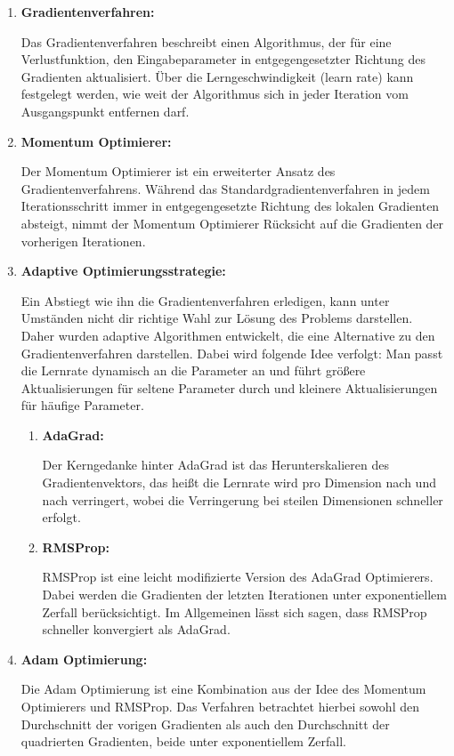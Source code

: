 	\begin{enumerate}
		\item \textbf{Gradientenverfahren:}
		
			Das Gradientenverfahren beschreibt einen Algorithmus, der für eine Verlustfunktion, den Eingabeparameter in entgegengesetzter Richtung des Gradienten aktualisiert. Über die  Lerngeschwindigkeit (learn rate) kann festgelegt werden, wie weit der Algorithmus sich in jeder Iteration vom Ausgangspunkt entfernen darf. \cite{lucas_plagwitz}
		
		\item \textbf{Momentum Optimierer:}
		
			Der Momentum Optimierer ist ein erweiterter Ansatz des Gradientenverfahrens. Während das \glqq Standardgradientenverfahren\grqq{} in jedem Iterationsschritt immer in entgegengesetzte Richtung des lokalen Gradienten absteigt, nimmt der Momentum Optimierer Rücksicht auf die Gradienten der vorherigen Iterationen. \cite{lucas_plagwitz}
			
		\item \textbf{Adaptive Optimierungsstrategie:}
		
			Ein Abstiegt wie ihn die Gradientenverfahren erledigen, kann unter Umständen nicht dir richtige Wahl zur Lösung des Problems darstellen. Daher wurden adaptive Algorithmen entwickelt, die eine Alternative zu den Gradientenverfahren darstellen. Dabei wird folgende Idee verfolgt: Man passt die Lernrate dynamisch an die Parameter an und führt größere Aktualisierungen für seltene Parameter durch und kleinere Aktualisierungen für häufige Parameter. \cite{lucas_plagwitz}
			\newpage
			\begin{enumerate}
				\item \textbf{AdaGrad:}
				
					Der Kerngedanke hinter AdaGrad ist das Herunterskalieren des Gradientenvektors, das heißt die Lernrate wird pro Dimension nach und nach verringert, wobei die Verringerung bei steilen Dimensionen schneller erfolgt. \cite{lucas_plagwitz}
					
				\item \textbf{RMSProp:}
				
					RMSProp ist eine leicht modifizierte Version des AdaGrad Optimierers. Dabei werden die Gradienten der letzten Iterationen unter exponentiellem Zerfall  berücksichtigt. Im Allgemeinen lässt sich sagen, dass RMSProp schneller konvergiert als AdaGrad. \cite{lucas_plagwitz}
				
					
			\end{enumerate}
		
			
		\item \textbf{Adam Optimierung:}
		
			Die Adam Optimierung ist eine Kombination aus der Idee des Momentum Optimierers und RMSProp. Das Verfahren betrachtet hierbei sowohl den Durchschnitt der vorigen Gradienten als auch den Durchschnitt der quadrierten Gradienten, beide unter exponentiellem Zerfall. \cite{lucas_plagwitz}
			
	\end{enumerate}

